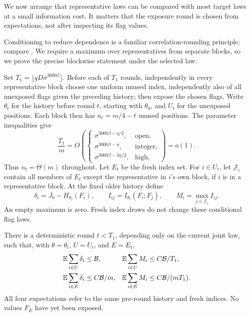 We now arrange that representative laws can be compared with most target
laws at a small information cost. It matters that the exposure round is
chosen from expectations, not after inspecting its flag values.

Conditioning to reduce dependence is a familiar correlation-rounding
principle; compare \cite[Lemma~4.5]{RaghavendraTan2011}. We require a
maximum over representatives from separate blocks, so we prove the
precise blockwise statement under the selected law.

Set $T_1=\lfloor qD\sigma^{3000\beta}\rfloor$. Before each of
$T_1$ rounds, independently in every representative block choose one
uniform unused index, independently also of all unexposed flags given
the preceding history; then expose the chosen flags. Write $\theta_t$
for the history before round $t$, starting with $\theta_0$, and $U_t$
for the unexposed positions. Each block then has
$n_t=m/4-t$ unused positions. The parameter inequalities give
\[
 \frac{T_1}{m}=O\!\left(
 \begin{cases}
 \sigma^{3000\beta-\eta/2},&\text{open},\\
 \sigma^{3000\beta-\eta},&\text{integer},\\
 \sigma^{3000\beta-3\eta/2},&\text{high},
 \end{cases}\right)=o(1).
\]
Thus $n_t=\Theta(m)$ throughout. Let $E_t$ be the fresh index set.
For $i\in U_t$, let $\mathcal J_i$ contain all members of $E_t$
except the representative in $i$'s own block, if $i$ is in a
representative block. At the fixed older history define
\[
 \delta_i=J_0-H_{\theta_t}(F_i),\qquad
 I_{ij}=I_{\theta_t}(F_i;F_j),\qquad
 M_i=\max_{j\in\mathcal J_i}I_{ij}.
\]
An empty maximum is zero. Fresh index draws do not change these
conditional flag laws.

\begin{lemma}\label{mark:representatives}
There is a deterministic round $t<T_1$, depending only on the current
joint law, such that, with $\theta=\theta_t$, $U=U_t$, and $E=E_t$,
\begin{equation}\label{mark:representative-bounds}
 \begin{aligned}
 \mathbb E\sum_{i\in U}\delta_i&\le\mathcal B,&
 \mathbb E\sum_{i\in U}M_i&\le C\mathcal B/T_1,\\
 \mathbb E\sum_{i\in E}\delta_i&\le C\mathcal B/m,&
 \mathbb E\sum_{i\in E}M_i&\le C\mathcal B/(mT_1).
 \end{aligned}
\end{equation}
All four expectations refer to the same pre-round history and fresh
indices. No values $F_E$ have yet been exposed.
\end{lemma}

